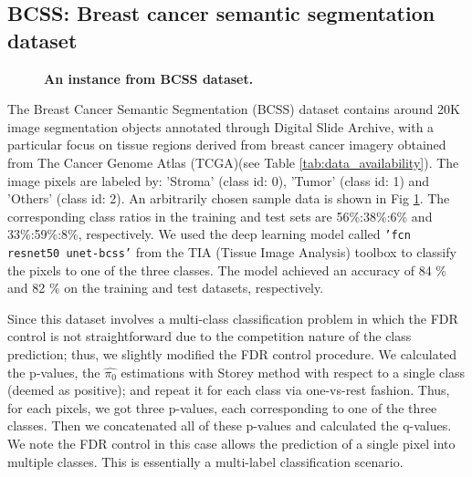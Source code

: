 \documentclass[10pt,letterpaper]{article}
\begin{document}
\subsection*{BCSS: Breast cancer semantic segmentation dataset}

\begin{figure}[h!]
	\centering
	\caption{{\bf An instance from BCSS dataset.}}
	\label{fig:bcss_example}
\end{figure} 

The Breast Cancer Semantic Segmentation (BCSS) dataset \cite{Amgad2019StructuredCE} contains around 20K image segmentation objects annotated through Digital Slide Archive, with a particular focus on tissue regions derived from breast cancer imagery obtained from The Cancer Genome Atlas (TCGA)(see Table \ref{tab:data_availability}).
The image pixels are labeled by: 'Stroma' (class id: 0), 'Tumor' (class id: 1) and 'Others' (class id: 2).
An arbitrarily chosen sample data is shown in Fig \ref{fig:bcss_example}.
The corresponding class ratios in the training and test sets are 56\%:38\%:6\% and 33\%:59\%:8\%, respectively.
We used the deep learning model called \texttt{'fcn resnet50 unet-bcss'} from the TIA (Tissue Image Analysis) toolbox \cite{Pocock2022} to classify the pixels to one of the three classes.
The model achieved an accuracy of 84 \% and 82 \% on the training and test datasets, respectively. 


Since this dataset involves a multi-class classification problem in which the FDR control is not straightforward due to the competition nature of the class prediction; thus,  we slightly modified the FDR control procedure.
We calculated the p-values, the $\hat{\pi_0}$ estimations with Storey method with respect to a single class (deemed as positive); and repeat it for each class via one-vs-rest fashion.
Thus, for each pixels, we got three p-values, each corresponding to one of the three classes.
Then we concatenated all of these p-values and calculated the q-values.
We note the FDR control in this case allows the prediction of a single pixel into multiple classes.
This is essentially a multi-label classification scenario. 



\end{document}
